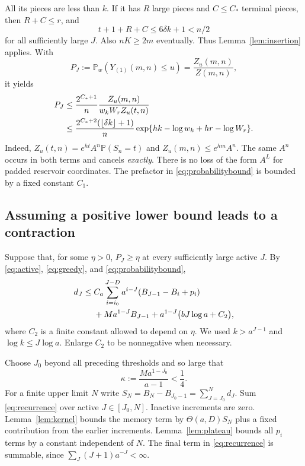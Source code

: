 \documentclass[11pt]{article}
\theoremstyle{remark}\newtheorem{remark}[theorem]{Remark}
\newcommand{\Pp}{\mathbb P}
\begin{document}
All its pieces are less than $k$. If it has $R$ large pieces and $C\le C_*$
terminal pieces, then $R+C\le r$, and
\[
 t+1+R+C\le6\delta k+1<n/2
\]
for all sufficiently large $J$. Also $nK\ge2m$ eventually. Thus
Lemma~\ref{lem:insertion} applies. With
\[
 P_J:=\Pp_w(Y_{(1)}(m,n)\le u)=\frac{Z_u(m,n)}{Z(m,n)},
\]
it yields
\begin{align}
 P_J
 &\le\frac{2^{C_*+1}}{n}
       \frac{Z_u(m,n)}{w_kW_r Z_u(t,n)}\notag\\
 &\le\frac{2^{C_*+2}(\lfloor\delta k\rfloor+1)}{n}
       \exp\{hk-\log w_k+hr-\log W_r\}.\label{eq:probabilitybound}
\end{align}
Indeed,
$Z_u(t,n)=e^{ht}A^n\Pp(S_n=t)$ and $Z_u(m,n)\le e^{hm}A^n$.
The same $A^n$ occurs in both terms and cancels \emph{exactly}. There is no
loss of the form $A^L$ for padded reservoir coordinates. The prefactor in
\eqref{eq:probabilitybound} is bounded by a fixed constant $C_1$.

\subsection{Assuming a positive lower bound leads to a contraction}
Suppose that, for some $\eta>0$, $P_J\ge\eta$ at every sufficiently large
active $J$. By \eqref{eq:active}, \eqref{eq:greedy}, and
\eqref{eq:probabilitybound},
\begin{align}
 d_J\le{}&C_a\sum_{i=i_0}^{J-D}a^{i-J}
                 (B_{J-1}-B_i+p_i)\notag\\
 &+Ma^{1-J}B_{J-1}
   +a^{1-J}\bigl(bJ\log a+C_2\bigr),\label{eq:recurrence}
\end{align}
where $C_2$ is a finite constant allowed to depend on $\eta$.
We used $k>a^{J-1}$ and $\log k\le J\log a$. Enlarge $C_2$ to be
nonnegative when necessary.

Choose $J_0$ beyond all preceding thresholds and so large that
\begin{equation}\label{eq:kappa}
 \kappa:=\frac{Ma^{1-J_0}}{a-1}<\frac14.
\end{equation}
For a finite upper limit $N$ write
$S_N=B_N-B_{J_0-1}=\sum_{J=J_0}^N d_J$. Sum \eqref{eq:recurrence} over
active $J\in[J_0,N]$. Inactive increments are zero. Lemma~\ref{lem:kernel}
bounds the memory term by $\Theta(a,D)S_N$ plus a fixed contribution from
the earlier increments. Lemma~\ref{lem:plateau} bounds all $p_i$ terms by
a constant independent of $N$. The final term in \eqref{eq:recurrence} is
summable, since $\sum_J (J+1)a^{-J}<\infty$.
\end{document}
